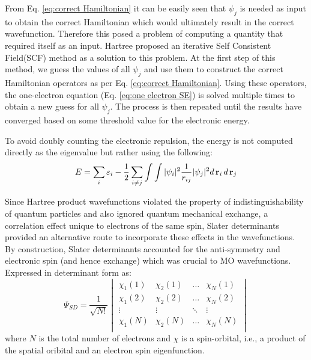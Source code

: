             From Eq. \eqref{eq:correct Hamiltonian} it can be easily seen that $\psi_j$ is needed as input to obtain the correct Hamiltonian which would ultimately result in the correct wavefunction. Therefore this posed a problem of computing a quantity that required itself as an input. Hartree proposed an iterative Self Consistent Field(SCF) method as a solution to this problem. At the first step of this method, we guess the values of all $\psi_j$ and use them to construct the correct Hamiltonian operators as per Eq. \eqref{eq:correct Hamiltonian}. Using these operators, the one-electron \Schrodinger{} equation (Eq. \eqref{eq:one electron SE}) is solved multiple times to obtain a new guess for all $\psi_j$. The process is then repeated until the results have converged based on some threshold value for the electronic energy.

            To avoid doubly counting the electronic repulsion, the energy is not computed directly as the eigenvalue but rather using the following:
            \begin{equation}\label{eq:Hartree Hamiltonian energy}
                E = \displaystyle\sum_i \varepsilon_i - \frac{1}{2} \sum_{i \ne j} \int \int |\psi_i|^2 \frac{1}{r_{ij}} |\psi_j|^2 d\,{\mathbf {r}}_i\, d\,{\mathbf {r}}_j
            \end{equation}

            Since Hartree product wavefunctions violated the property of indistinguishability of quantum particles and also ignored quantum mechanical exchange, a correlation effect unique to electrons of the same spin, Slater determinants provided an alternative route to incorporate these effects in the wavefunctions. By construction, Slater determinants accounted for the anti-symmetry and electronic spin (and hence exchange) which was crucial to MO wavefunctions. Expressed in determinant form as:
            \begin{equation}\label{eq:Slater determinant}
                \Psi_{SD} = \frac{1}{\sqrt{N!}}
                \begin{vmatrix}
                    \chi_1 (1) & \chi_2 (1) & \ldots & \chi_N (1)\\
                    \chi_1 (2) & \chi_2 (2) & \ldots & \chi_N (2)\\
                    \vdots & \vdots & \ddots & \vdots\\
                    \chi_1 (N) & \chi_2 (N) & \ldots & \chi_N (N)\\
                \end{vmatrix}
            \end{equation}
            where $N$ is the total number of electrons and $\chi$ is a spin-orbital, i.e., a product of the spatial oribital and an electron spin eigenfunction.

